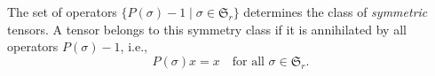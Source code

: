 The set of operators $\{P(\sigma) - 1 \mid \sigma \in \mathfrak{S}_r\}$ determines the class of \textit{symmetric} tensors. A tensor belongs to this symmetry class if it is annihilated by all operators $P(\sigma) - 1$, i.e.,
$$P(\sigma)x = x \quad \text{for all } \sigma \in \mathfrak{S}_r.$$

